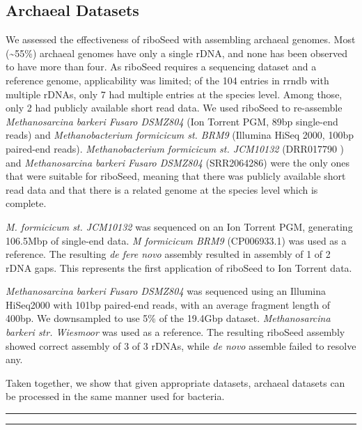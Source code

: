 \documentclass[10pt]{article}
\def \thoughtbr {\begin{center}\noindent\rule{.4\textwidth}{0.4pt}  {\raisebox{-.5ex}{$\sim$}}  \rule{.4\textwidth}{0.4pt}\end{center}}
\def \ttilde {\raisebox{-.5ex}\textasciitilde} %
\begin{document}
\subsection*{Archaeal Datasets}
We assessed the effectiveness of riboSeed with assembling archaeal genomes. Most (\ttilde55\%) archaeal genomes have only a single rDNA, and none has been observed to have more than four. As riboSeed requires a sequencing dataset and a reference genome, applicability was limited; of the 104 entries in rrndb with multiple rDNAs, only 7 had multiple entries at the species level. Among those, only 2 had publicly available short read data. We used riboSeed to re-assemble \textit{Methanosarcina barkeri Fusaro DSMZ804} (Ion Torrent PGM, 89bp single-end reads) and \textit{Methanobacterium formicicum st. BRM9} (Illumina HiSeq 2000, 100bp paired-end reads). \textit{Methanobacterium formicicum st. JCM10132} (DRR017790 ) and \textit{Methanosarcina barkeri Fusaro DSMZ804} (SRR2064286) were the only ones that were suitable for riboSeed, meaning that there was publicly available short read data and that there is a related genome at the species level which is complete.


\textit{M. formicicum st. JCM10132} was sequenced on an Ion Torrent PGM, generating 106.5Mbp of single-end data. \textit{M formicicum BRM9} (CP006933.1) was used as a reference. The resulting \textit{de fere novo} assembly resulted in assembly of 1 of 2 rDNA gaps. This represents the first application of riboSeed to Ion Torrent data.


\textit{Methanosarcina barkeri Fusaro DSMZ804} was sequenced using an Illumina HiSeq2000 with 101bp paired-end reads, with an average fragment length of 400bp. We downsampled to use 5\% of the 19.4Gbp dataset. \textit{Methanosarcina barkeri str. Wiesmoor} was used as a reference. The resulting riboSeed assembly showed correct assembly of 3 of 3 rDNAs, while \textit{de novo} assemble failed to resolve any.


Taken together, we show that given appropriate datasets, archaeal datasets can be processed in the same manner used for bacteria.

\thoughtbr
\end{document}

